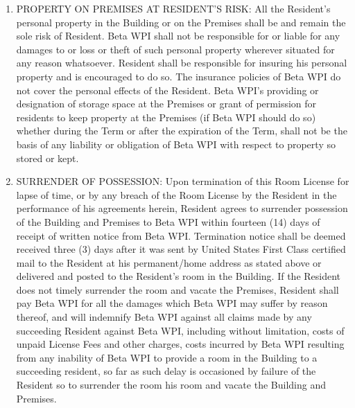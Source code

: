 \documentclass[legalpaper, 12pt]{article}
\begin{document}
\begin{enumerate}
        \item PROPERTY ON PREMISES AT RESIDENT'S RISK\@: All the Resident’s
                personal property in the Building or on the Premises shall be
                and remain the sole risk of Resident.  Beta WPI shall not be
                responsible for or liable for any damages to or loss or theft of
                such personal property wherever situated for any reason
                whatsoever.  Resident shall be responsible for insuring his
                personal property and is encouraged to do so.  The insurance
                policies of Beta WPI do not cover the personal effects of the
                Resident.  Beta WPI’s providing or designation of storage space
                at the Premises or grant of permission for residents to keep
                property at the Premises (if Beta WPI should do so) whether
                during the Term or after the expiration of the Term, shall not
                be the basis of any liability or obligation of Beta WPI with
                respect to property so stored or kept.

        \item SURRENDER OF POSSESSION\@: Upon termination of this Room License
                for lapse of time, or by any breach of the Room License by the
                Resident in the performance of his agreements herein, Resident
                agrees to surrender possession of the Building and Premises to
                Beta WPI within fourteen (14) days of receipt of written notice
                from Beta WPI\@.  Termination notice shall be deemed received
                three (3) days after it was sent by United States First Class
                certified mail to the Resident at his permanent/home address as
                stated above or delivered and posted to the Resident’s room in
                the Building.  If the Resident does not timely surrender the
                room and vacate the Premises, Resident shall pay Beta WPI for
                all the damages which Beta WPI may suffer by reason thereof, and
                will indemnify Beta WPI against all claims made by any
                succeeding Resident against Beta WPI, including without
                limitation, costs of unpaid License Fees and other charges,
                costs incurred by Beta WPI resulting from any inability of Beta
                WPI to provide a room in the Building to a succeeding resident,
                so far as such delay is occasioned by failure of the Resident so
                to surrender the room his room and vacate the Building  and
                Premises.


\end{enumerate}
\end{document}
